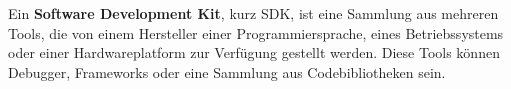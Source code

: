 Ein \textbf{Software Development Kit}, kurz SDK, ist eine Sammlung aus mehreren Tools, die von einem Hersteller einer Programmiersprache, eines Betriebssystems oder einer Hardwareplatform zur Verfügung gestellt werden. Diese Tools können Debugger, Frameworks oder eine Sammlung aus Codebibliotheken sein.